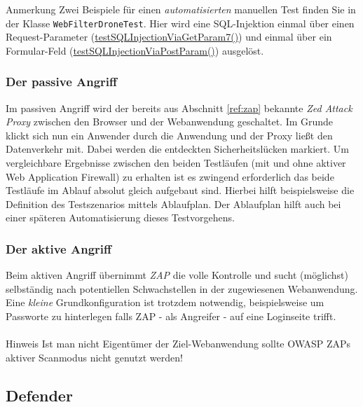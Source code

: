\textcolor{bhtGray}{ Anmerkung} Zwei Beispiele für einen \glqq\emph{automatisierten}\grqq{} manuellen Test finden Sie in der Klasse \verb=WebFilterDroneTest=. Hier wird eine SQL-Injektion einmal über einen Request-Parameter (\href{https://github.com/devtty/webcastellum/blob/3c45a017e2aa17e553d2517308210ab7bf614904/src/test/java/org/webcastellum/test/WebFilterDroneTest.java\#L88}{testSQLInjectionViaGetParam7()}) und einmal über ein Formular-Feld (\href{https://github.com/devtty/webcastellum/blob/3c45a017e2aa17e553d2517308210ab7bf614904/src/test/java/org/webcastellum/test/WebFilterDroneTest.java\#L121}{testSQLInjectionViaPostParam()}) ausgelöst.


\subsubsection{Der passive Angriff}
Im passiven Angriff wird der bereits aus Abschnitt \ref{ref:zap} bekannte \emph{Zed Attack Proxy} zwischen den Browser und der Webanwendung geschaltet. Im Grunde klickt sich nun ein Anwender durch die Anwendung und der Proxy ließt den Datenverkehr mit. Dabei werden die entdeckten Sicherheitslücken markiert. Um vergleichbare Ergebnisse zwischen den beiden Testläufen (mit und ohne aktiver Web Application Firewall) zu erhalten ist es zwingend erforderlich das beide Testläufe im Ablauf absolut gleich aufgebaut sind. Hierbei hilft beispielsweise die Definition des Testszenarios mittels Ablaufplan. Der Ablaufplan hilft auch bei einer späteren Automatisierung dieses Testvorgehens.

\subsubsection{Der aktive Angriff}
Beim aktiven Angriff übernimmt \emph{ZAP} die volle Kontrolle und sucht (möglichst) selbständig nach potentiellen Schwachstellen in der zugewiesenen Webanwendung. Eine \emph{kleine} Grundkonfiguration ist trotzdem notwendig, beispielsweise um Passworte zu hinterlegen falls ZAP - als Angreifer - auf eine Loginseite trifft. \\\\
\textcolor{bhtGray}{ Hinweis} Ist man nicht Eigentümer der Ziel-Webanwendung sollte OWASP ZAPs aktiver Scanmodus nicht genutzt werden!\\


\subsection{Defender}

